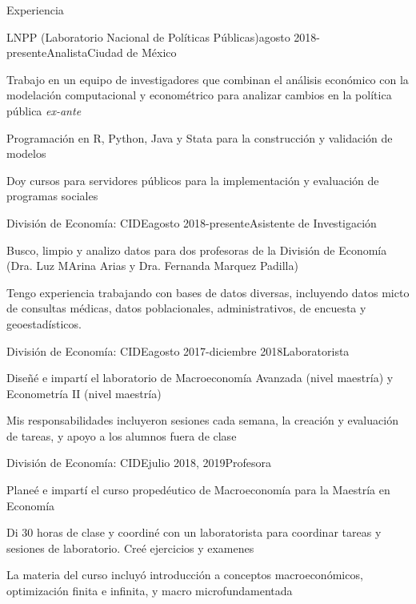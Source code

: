 \documentclass{resume} %
\begin{document}
\begin{rSection}{Experiencia}

\begin{rSubsection}{LNPP (Laboratorio Nacional de Políticas Públicas)}{agosto 2018-presente}{Analista}{Ciudad de México}
\item Trabajo en un equipo de investigadores que combinan el análisis económico con la modelación computacional y econométrico para analizar cambios en la política pública \textit{ex-ante}
\item Programación en R, Python, Java y Stata para la construcción y validación de modelos 
\item Doy cursos para servidores públicos para la implementación y evaluación de programas sociales
\end{rSubsection}


\begin{rSubsection}{División de Economía: CIDE}{agosto 2018-presente}{Asistente de Investigación}{}
\item Busco, limpio y analizo datos para dos profesoras de la División de Economía (Dra. Luz MArina Arias y Dra. Fernanda Marquez Padilla)
\item Tengo experiencia trabajando con bases de datos diversas, incluyendo datos micto de consultas médicas, datos poblacionales, administrativos, de encuesta y geoestadísticos.
\end{rSubsection}

\begin{rSubsection}{División de Economía: CIDE}{agosto 2017-diciembre 2018}{Laboratorista}{}
\item Diseñé e impartí el laboratorio de Macroeconomía Avanzada (nivel maestría) y Econometría II (nivel maestría)
\item Mis responsabilidades incluyeron sesiones cada semana, la creación y evaluación de tareas, y apoyo a los alumnos fuera de clase 
\end{rSubsection}

\begin{rSubsection}{División de Economía: CIDE}{julio 2018, 2019}{Profesora}{}
\item Planeé e impartí el curso propedéutico de Macroeconomía para la Maestría en Economía 
\item Di 30 horas de clase y coordiné con un laboratorista para coordinar tareas y sesiones de laboratorio. Creé ejercicios y examenes
\item La materia del curso incluyó introducción a conceptos macroeconómicos, optimización finita e infinita, y macro microfundamentada 
\end{rSubsection}


\end{rSection}
\end{document}
